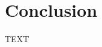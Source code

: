 \documentclass[journal abbreviation, manuscript]{copernicus}
\begin{document}
\section{Conclusion}  %
TEXT












\appendix
\section{}    %

\subsection{}     %


\noappendix       %



\end{document}
